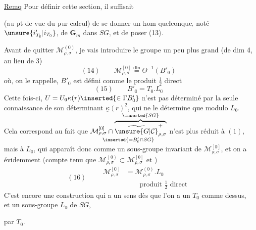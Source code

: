 \uline{Remq}\quad{}
Pour définir cette section, il suffisait



(au pt de vue du pur calcul) de se donner un hom quelconque, noté
$\unsure{i'_{T_0}|i_{T_0}}$, de $\mathbf G_m$ dans $SG$, et de poser (13).

Avant de quitter $\mathcal M_{\rho,\sigma}^{(0)}$, je vais introduire le groupe
un peu plus grand (de dim 4, au lieu de 3)
\[
(14)\qquad\mathcal M_{\rho,\sigma}^{[0]}
\overset{\mathrm{dfn}}{=}\Theta^{-1}(B'_0)
\]
où, on le rappelle, $B'_0$ est défini comme le produit $\frac12$ direct
\[
(15)\qquad B'_0=T_0.L_0
\]
Cette fois-ci, $U=U_0\kappa(r)\inserted{\in\Gamma B'_0}$ n'est pas déterminé
par la seule connaissance de son déterminant
$\underline\kappa(r)^2$, qui ne le détermine que modulo $L_0$.
Cela correspond au fait que
$\underset{\inserted{=B'_0\cap SG}}{
\mathcal M_{\rho,\sigma}^{[0]}\cap
\overbrace{\widetilde{\unsure{G|\mathcal C}}_{\rho,\sigma}^{+}}^{\inserted{SG}}}$
n'est plus réduit à $(1)$, mais à $L_0$, qui apparaît donc comme
un sous-groupe invariant de $\mathcal M_{\rho,\sigma}^{[0]}$, et on a évidemment
(compte tenu que $\mathcal M_{\rho,\sigma}^{(0)}\subset\mathcal M_{\rho,\sigma}^{[0]}$ et
) 
\[
(16)\qquad\begin{aligned}
\mathcal M_{\rho,\sigma}^{[0]}&=\mathcal M_{\rho,\sigma}^{(0)}.L_0\\
&\qquad\text{produit }\frac12\text{ direct}
\end{aligned}
\]
C'est encore une construction qui a un sens dès que l'on a un $T_0$ comme dessus,
 et un sous-groupe  $L_0$ de $SG$,



 par $T_0$. 

